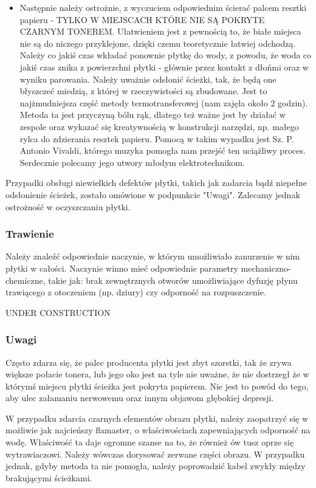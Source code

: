 \begin{itemize}
\item Następnie należy ostrożnie, z wyczuciem odpowiednim ścierać palcem resztki papieru - TYLKO W MIEJSCACH KTÓRE NIE SĄ POKRYTE CZARNYM TONEREM. Ułatwieniem jest z pewnością to, że białe miejsca nie są do niczego przyklejone, dzięki czemu teoretycznie łatwiej odchodzą. Należy co jakiś czas wkładać ponownie płytkę do wody, z powodu, że woda co jakiś czas znika z powierzchni płytki - głównie przez kontakt z dłońmi oraz w wyniku parowania. Należy uważnie odsłonić ścieżki, tak, że będą one błyszczeć miedzią, z której w rzeczywistości są zbudowane. Jest to najżmudniejsza część metody termotransferowej (nam zajęła około 2 godzin). Metoda ta jest przyczyną bólu rąk, dlatego też ważne jest by działać w zespole oraz wykazać się kreatywnością w konstrukcji narzędzi, np. małego rylca do zdzierania resztek papieru. Pomocą w takim wypadku jest Sz. P. Antonio Vivaldi, którego muzyka pomogła nam przejść ten uciążliwy proces. Serdecznie polecamy jego utwory młodym elektrotechnikom.
\end{itemize}

Przypadki obsługi niewielkich defektów płytki, takich jak zadarcia bądź niepełne odsłonienie ścieżek, zostało omówione w podpunkcie "Uwagi". Zalecamy jednak ostrożność w oczyszczaniu płytki.

\subsubsection{Trawienie}

Należy znaleźć odpowiednie naczynie, w którym umożliwiało zanurzenie w nim płytki w całości. Naczynie winno mieć odpowiednie parametry mechaniczno-chemiczne, takie jak: brak zewnętrznych otworów umożliwiające dyfuzję płynu trawiącego z otoczeniem (np. dziury) czy odporność na rozpuszczenie.

UNDER CONSTRUCTION

\subsubsection{Uwagi}

Często zdarza się, że palec producenta płytki jest zbyt szorstki, tak że zrywa większe połacie tonera, lub jego oko jest na tyle nie uważne, że nie dostrzegł że w którymś miejscu płytki ścieżka jest pokryta papierem. Nie  jest to powód do tego, aby ulec załamaniu nerwowemu oraz innym objawom głębokiej depresji.

W przypadku zdarcia czarnych elementów obrazu płytki, należy zaopatrzyć się w możliwie jak najcieńszy flamaster, o właściwościach zapewniających odporność na wodę. Właściwość ta daje ogromne szanse na to, że również ów tusz oprze się wytrawiaczowi. Należy wówczas dorysować zerwane części obrazu. W przypadku jednak, gdyby metoda ta nie pomogła, należy poprowadzić kabel zwykły między brakującymi ścieżkami. 

